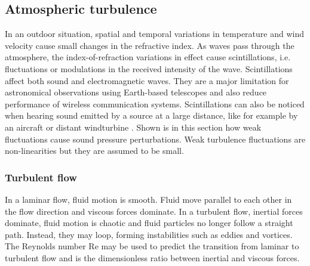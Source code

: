 



\subsection{Atmospheric turbulence}\label{theory:sound-propagation:atmospheric-turbulence}

In an outdoor situation, spatial and temporal variations in temperature and wind
velocity cause small changes in the refractive index. As waves pass through the
atmosphere, the index-of-refraction variations in effect cause scintillations,
i.e. fluctuations or modulations in the received intensity of the wave.
Scintillations affect both sound and electromagnetic waves. They are a major
limitation for astronomical observations using Earth-based telescopes and also
reduce performance of wireless communication systems. Scintillations can also be
noticed when hearing sound emitted by a source at a large distance, like for
example by an aircraft or distant windturbine \cite{Heutschi2014}.
Shown is in this section how weak fluctuations
cause sound pressure perturbations. Weak turbulence fluctuations are
non-linearities but they are assumed to be small.


\subsubsection*{Turbulent flow}
In a laminar flow, fluid motion is smooth. Fluid  move parallel
to each other in the flow direction and viscous forces dominate. In a turbulent
flow, inertial forces dominate, fluid motion is chaotic and fluid particles no
longer follow a straight path. Instead, they may loop, forming instabilities
such as eddies and vortices. The Reynolds number $\mathrm{Re}$ may be used to
predict the transition from laminar to turbulent flow and is the dimensionless
ratio between inertial and viscous forces.

